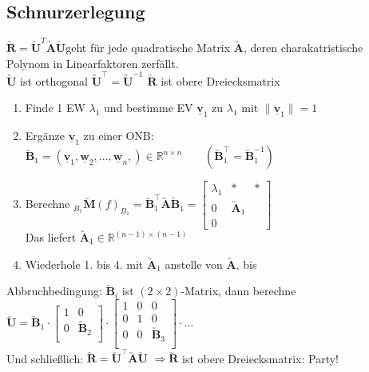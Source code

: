 \documentclass[6pt,a4paper]{scrartcl}
\newcommand{\norm}[1]{\ensuremath{\|#1\|}}														%
\newcommand{\mat}[1]{\ensuremath{\begin{bmatrix} #1 \end{bmatrix}}}								%
\newcommand{\ma}[1]{\ensuremath{\utilde{\boldsymbol {#1}}}}										%
\renewcommand{\vec}[1]{\ensuremath{\underline{\boldsymbol {#1}}}}								%
\newcommand{\Ra}[0]{\ensuremath{\Rightarrow}}									%
\begin{document}
\begin{multicols}{4}
\subsection{Schnurzerlegung}
$\ma R = \ma U^T \ma A \ma U$\quad geht für jede quadratische Matrix $\ma A$, deren charakatristische Polynom in Linearfaktoren zerfällt.\\
$\ma U$ ist orthogonal $\ma U^\top = \ma U^{-1}$ \quad $\ma R$ ist obere Dreiecksmatrix

\begin{enumerate} \itemsep0pt
\item Finde 1 EW $\lambda_1$ und bestimme EV $\vec v_1$ zu $\lambda_1$ mit $\norm{\vec v_1} = 1$
\item Ergänze $\vec v_1$ zu einer ONB:\\ $\ma B_1 = (\vec v_1, \vec w_2, ..., \vec w_n,) \in \mathbb R^{n \times n} \qquad (\ma B^\top_1 = \ma B^{-1}_1)$\\
\item Berechne $_{B_1} \ma M(f)_{B_1} = \ma B^\top_1 \ma A \ma B_1 = \mat{\lambda_1 & * & * \\ 0 & \ma A_1 &  \\ 0 &  &  }$  \\ 
		Das liefert $\ma A_1 \in \mathbb R^{(n-1)\times(n-1)}$\\
\item Wiederhole 1. bis 4. mit $\ma A_1$ anstelle von $\ma A$, bis
\end{enumerate}
Abbruchbedingung: $\ma B_i$ ist $(2 \times 2)$-Matrix, dann berechne\\
$\ma U = \ma B_1 \cdot \mat{1  & 0 \\ 0 & \ma B_2 \\} \cdot \mat{1 & 0 & 0 \\ 0 & 1 & 0 \\ 0 & 0 & \ma B_3 \\} \cdot \ldots $\\
Und schließlich: $\ma R = \ma U^\top \ma A \ma U$ \quad $\Ra \ma R$ ist obere Dreiecksmatrix: Party!




\end{multicols}
\end{document}
